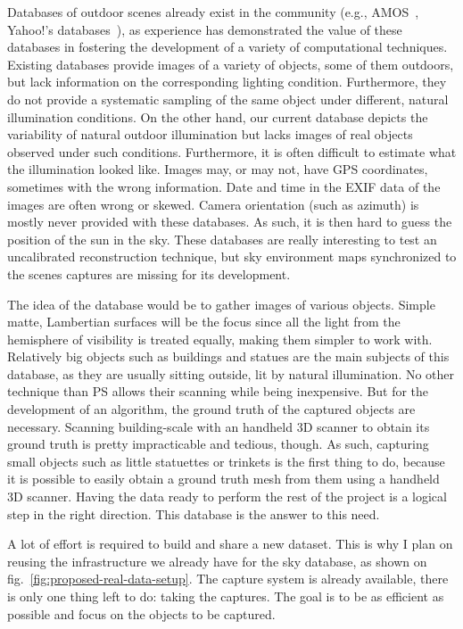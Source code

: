Databases of outdoor scenes already exist in the community (e.g., AMOS~\cite{jacobs-cvpr-2007}, Yahoo!'s databases~\cite{thomee-arxiv-15}), as experience has demonstrated the value of these databases in fostering the development of a variety of computational techniques. Existing databases provide images of a variety of objects, some of them outdoors, but lack information on the corresponding lighting condition. Furthermore, they do not provide a systematic sampling of the same object under different, natural illumination conditions. On the other hand, our current database depicts the variability of natural outdoor illumination but lacks images of real objects observed under such conditions. Furthermore, it is often difficult to estimate what the illumination looked like. Images may, or may not, have GPS coordinates, sometimes with the wrong information. Date and time in the EXIF data of the images are often wrong or skewed. Camera orientation (such as azimuth) is mostly never provided with these databases. As such, it is then hard to guess the position of the sun in the sky. These databases are really interesting to test an uncalibrated reconstruction technique, but sky environment maps synchronized to the scenes captures are missing for its development.

The idea of the database would be to gather images of various objects. Simple matte, Lambertian surfaces will be the focus since all the light from the hemisphere of visibility is treated equally, making them simpler to work with. Relatively big objects such as buildings and statues are the main subjects of this database, as they are usually sitting outside, lit by natural illumination. No other technique than PS allows their scanning while being inexpensive. But for the development of an algorithm, the ground truth of the captured objects are necessary. Scanning building-scale with an handheld 3D scanner to obtain its ground truth is pretty impracticable and tedious, though. As such, capturing small objects such as little statuettes or trinkets is the first thing to do, because it is possible to easily obtain a ground truth mesh from them using a handheld 3D scanner. Having the data ready to perform the rest of the project is a logical step in the right direction. This database is the answer to this need.

A lot of effort is required to build and share a new dataset. This is why I plan on reusing the infrastructure we already have for the sky database, as shown on fig.~\ref{fig:proposed-real-data-setup}. The capture system is already available, there is only one thing left to do: taking the captures. The goal is to be as efficient as possible and focus on the objects to be captured.


